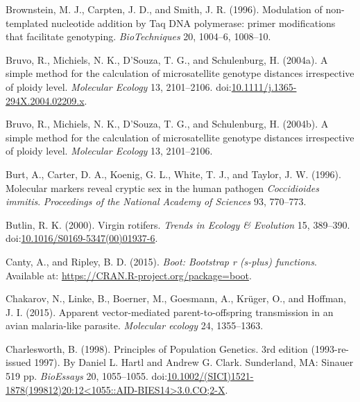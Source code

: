 \documentclass[double,12pt]{beavtex}
\begin{document}
  \hypertarget{ref-brownstein1996modulation}{}
  Brownstein, M. J., Carpten, J. D., and Smith, J. R. (1996). Modulation
  of non-templated nucleotide addition by Taq DNA polymerase: primer
  modifications that facilitate genotyping. \emph{BioTechniques} 20,
  1004--6, 1008--10.
  
  \hypertarget{ref-Bruvo:2004}{}
  Bruvo, R., Michiels, N. K., D'Souza, T. G., and Schulenburg, H. (2004a).
  A simple method for the calculation of microsatellite genotype distances
  irrespective of ploidy level. \emph{Molecular Ecology} 13, 2101--2106.
  doi:\href{https://doi.org/10.1111/j.1365-294X.2004.02209.x}{10.1111/j.1365-294X.2004.02209.x}.
  
  \hypertarget{ref-bruvo2004simple}{}
  Bruvo, R., Michiels, N. K., D'Souza, T. G., and Schulenburg, H. (2004b).
  A simple method for the calculation of microsatellite genotype distances
  irrespective of ploidy level. \emph{Molecular Ecology} 13, 2101--2106.
  
  \hypertarget{ref-burt1996molecular}{}
  Burt, A., Carter, D. A., Koenig, G. L., White, T. J., and Taylor, J. W.
  (1996). Molecular markers reveal cryptic sex in the human pathogen
  \emph{Coccidioides immitis}. \emph{Proceedings of the National Academy
  of Sciences} 93, 770--773.
  
  \hypertarget{ref-butlin2000virgin}{}
  Butlin, R. K. (2000). Virgin rotifers. \emph{Trends in Ecology \&
  Evolution} 15, 389--390.
  doi:\href{https://doi.org/10.1016/S0169-5347(00)01937-6}{10.1016/S0169-5347(00)01937-6}.
  
  \hypertarget{ref-canty2015boot}{}
  Canty, A., and Ripley, B. D. (2015). \emph{Boot: Bootstrap r (s-plus)
  functions}. Available at: \url{https://CRAN.R-project.org/package=boot}.
  
  \hypertarget{ref-chakarov2015apparent}{}
  Chakarov, N., Linke, B., Boerner, M., Goesmann, A., Krüger, O., and
  Hoffman, J. I. (2015). Apparent vector-mediated parent-to-offspring
  transmission in an avian malaria-like parasite. \emph{Molecular ecology}
  24, 1355--1363.
  
  \hypertarget{ref-Charlesworth_1998}{}
  Charlesworth, B. (1998). Principles of Population Genetics. 3rd edition
  (1993-re-issued 1997). By Daniel L. Hartl and Andrew G. Clark.
  Sunderland, MA: Sinauer 519 pp. \emph{BioEssays} 20, 1055--1055.
  doi:\href{https://doi.org/10.1002/(SICI)1521-1878(199812)20:12\%3C1055::AID-BIES14\%3E3.0.CO;2-X}{10.1002/(SICI)1521-1878(199812)20:12\textless{}1055::AID-BIES14\textgreater{}3.0.CO;2-X}.
  
\end{document}
